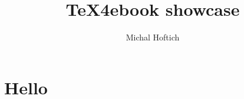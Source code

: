 \documentclass{article}
\begin{document}
	\title{\TeX 4ebook showcase}
	\author{Michal Hoftich}
	\maketitle
	\tableofcontents
	\section{Hello}
	\printglossaries
	\printbibliography
	\printindex
\end{document}
